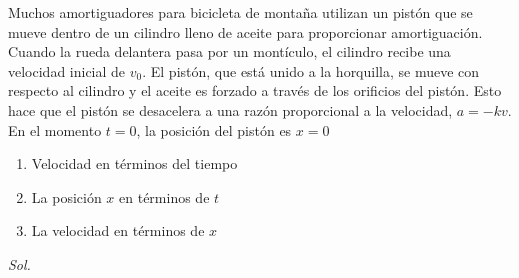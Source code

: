 \begin{example}
    Muchos amortiguadores para bicicleta de montaña utilizan un pistón que se mueve dentro de un cilindro lleno de aceite para proporcionar amortiguación.
    Cuando la rueda delantera pasa por un montículo, el cilindro recibe una velocidad inicial de $v_0$. El pistón, que está unido a la horquilla, se mueve con respecto al cilindro y el aceite es forzado a través de los orificios del pistón. Esto hace que el pistón se desacelera a una razón proporcional a la velocidad, $a=-kv$. En el momento $t=0$, la posición del pistón es $x=0$
    \begin{enumerate}
        \item Velocidad en términos del tiempo
        \item La posición $x$ en términos de $t$
        \item La velocidad en términos de $x$
    \end{enumerate}
\end{example}

\textit{ Sol. }

